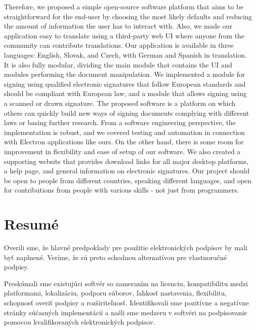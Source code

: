 \documentclass[thesismargins, english, thesislinespacing, onelinechapterstyle, upjsfrontpage]{rnthesis}
\begin{document}
Therefore, we proposed a simple open-source software platform that aims to be straightforward for the end-user by choosing the most likely defaults and reducing the amount of information the user has to interact with.
Also, we made our application easy to translate using a third-party web UI where anyone from the community can contribute translations.
Our application is available in three languages: English, Slovak, and Czech, with German and Spanish in translation.
It is also fully modular, dividing the main module that contains the UI and modules performing the document manipulation.
We implemented a module for signing using qualified electronic signatures that follow European standards and should be compliant with European law, and a module that allows signing using a scanned or drawn signature.
The proposed software is a platform on which others can quickly build new ways of signing documents complying with different laws or basing further research.
From a software engineering perspective, the implementation is robust, and we covered testing and automation in connection with Electron applications like ours.
On the other hand, there is some room for improvement in flexibility and ease of setup of our software.
We also created a supporting website that provides download links for all major desktop platforms, a help page, and general information on electronic signatures.
Our project should be open to people from different countries, speaking different languages, and open for contributions from people with various skills - not just from programmers.

\chapter*{Resumé}

Overili sme, že hlavné predpoklady pre použitie elektronických podpisov by mali byť naplnené.
Veríme, že sú preto schodnou alternatívou pre vlastnoručné podpisy.

Preskúmali sme existujúci softvér so zameraním na licenciu, kompatibilitu medzi platformami, lokalizáciu, podporu súborov, ľahkosť nastavenia, flexibilitu, schopnosť overiť podpisy a rozšíriteľnosť.
Identifikovali sme pozitívne a negatívne stránky súčasných implementácií a našli sme medzeru v softvéri na podpisovanie pomocou kvalifikovaných elektronických podpisov.
\end{document}
